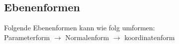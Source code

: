\subsection{Ebenenformen}
\label{sec:ebenen_formen}
Folgende Ebenenformen kann wie folg umformen: \\
Parameterform $\rightarrow$ Normalenform $\rightarrow$ koordinatenform





